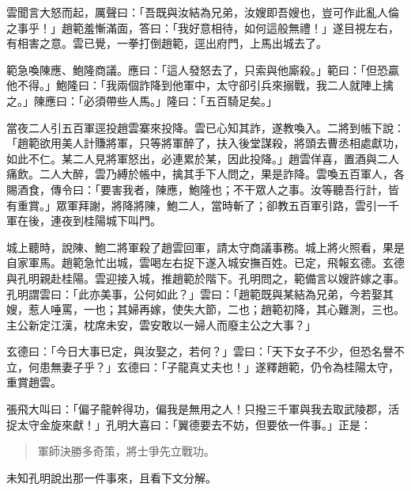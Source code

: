 雲聞言大怒而起，厲聲曰：「吾既與汝結為兄弟，汝嫂即吾嫂也，豈可作此亂人倫之事乎！」趙範羞慚滿面，答曰：「我好意相待，如何這般無禮！」遂目視左右，有相害之意。雲已覺，一拳打倒趙範，逕出府門，上馬出城去了。

範急喚陳應、鮑隆商議。應曰：「這人發怒去了，只索與他廝殺。」範曰：「但恐贏他不得。」鮑隆曰：「我兩個詐降到他軍中，太守卻引兵來搦戰，我二人就陣上擒之。」陳應曰：「必須帶些人馬。」隆曰：「五百騎足矣。」

當夜二人引五百軍逕投趙雲寨來投降。雲已心知其詐，遂教喚入。二將到帳下說：「趙範欲用美人計賺將軍，只等將軍醉了，扶入後堂謀殺，將頭去曹丞相處獻功，如此不仁。某二人見將軍怒出，必連累於某，因此投降。」趙雲佯喜，置酒與二人痛飲。二人大醉，雲乃縛於帳中，擒其手下人問之，果是詐降。雲喚五百軍人，各賜酒食，傳令曰：「要害我者，陳應，鮑隆也；不干眾人之事。汝等聽吾行計，皆有重賞。」眾軍拜謝，將降將陳，鮑二人，當時斬了；卻教五百軍引路，雲引一千軍在後，連夜到桂陽城下叫門。

城上聽時，說陳、鮑二將軍殺了趙雲回軍，請太守商議事務。城上將火照看，果是自家軍馬。趙範急忙出城，雲喝左右捉下遂入城安撫百姓。已定，飛報玄德。玄德與孔明親赴桂陽。雲迎接入城，推趙範於階下。孔明問之，範備言以嫂許嫁之事。孔明謂雲曰：「此亦美事，公何如此？」雲曰：「趙範既與某結為兄弟，今若娶其嫂，惹人唾罵，一也；其婦再嫁，使失大節，二也；趙範初降，其心難測，三也。主公新定江漢，枕席未安，雲安敢以一婦人而廢主公之大事？」

玄德曰：「今日大事已定，與汝娶之，若何？」雲曰：「天下女子不少，但恐名譽不立，何患無妻子乎？」玄德曰：「子龍真丈夫也！」遂釋趙範，仍令為桂陽太守，重賞趙雲。

張飛大叫曰：「偏子龍幹得功，偏我是無用之人！只撥三千軍與我去取武陵郡，活捉太守金旋來獻！」孔明大喜曰：「翼德要去不妨，但要依一件事。」正是：

\begin{quote}
軍師決勝多奇策，將士爭先立戰功。
\end{quote}

未知孔明說出那一件事來，且看下文分解。
